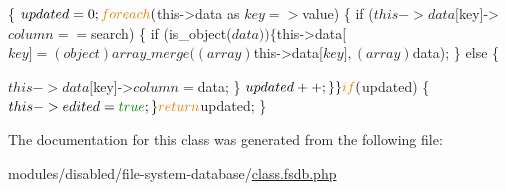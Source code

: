 \begin{DoxyCode}
                                                                             \{
                              $updated = 0;

                              \textcolor{keywordflow}{foreach}($this->data as $key => $value) \{
                                             \textcolor{keywordflow}{if} ($this->data[$key]->$column == 
      $search) \{
                                                            \textcolor{keywordflow}{if} (is\_object($data
      )) \{
                                                                           
      $this->data[$key] = (object) array\_merge((array) $this->data[$key], (array) $data);
                                                            \} \textcolor{keywordflow}{else} \{
                                                                           
      $this->data[$key]->$column = $data;
                                                            \}
                                                            $updated++;
                                             \}
                              \}

                              \textcolor{keywordflow}{if} ($updated) \{
                                             $this->edited = \textcolor{keyword}{true};
                              \}

                              \textcolor{keywordflow}{return} $updated;
               \}
\end{DoxyCode}


The documentation for this class was generated from the following file\-:\begin{DoxyCompactItemize}
\item 
modules/disabled/file-\/system-\/database/\hyperlink{class_8fsdb_8php}{class.\-fsdb.\-php}\end{DoxyCompactItemize}
